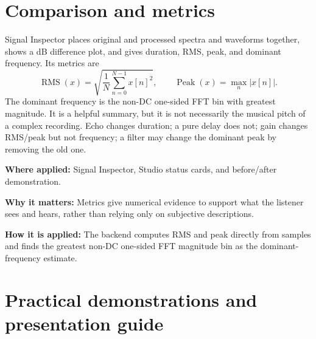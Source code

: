 \documentclass[11pt,a4paper]{article}
\newcommand{\applied}[3]{\begin{tcolorbox}[colback=white,colframe=black!28,boxrule=.3pt,arc=1mm,left=3mm,right=3mm,top=1.8mm,bottom=1.8mm]\small\textbf{Where applied:} #1\par\textbf{Why it matters:} #2\par\textbf{How it is applied:} #3\end{tcolorbox}}
\begin{document}
\section{Comparison and metrics}
Signal Inspector places original and processed spectra and waveforms together, shows a dB difference plot, and gives duration, RMS, peak, and dominant frequency. Its metrics are
\[
\operatorname{RMS}(x)=\sqrt{\frac{1}{N}\sum_{n=0}^{N-1}x[n]^2},\qquad
\operatorname{Peak}(x)=\max_n|x[n]|.
\]
The dominant frequency is the non-DC one-sided FFT bin with greatest magnitude. It is a helpful summary, but it is not necessarily the musical pitch of a complex recording. Echo changes duration; a pure delay does not; gain changes RMS/peak but not frequency; a filter may change the dominant peak by removing the old one.
\applied{Signal Inspector, Studio status cards, and before/after demonstration.}{Metrics give numerical evidence to support what the listener sees and hears, rather than relying only on subjective descriptions.}{The backend computes RMS and peak directly from samples and finds the greatest non-DC one-sided FFT magnitude bin as the dominant-frequency estimate.}

\section{Practical demonstrations and presentation guide}
\end{document}
